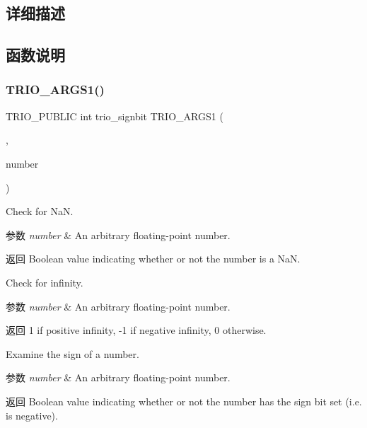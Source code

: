 \subsection{详细描述}


\subsection{函数说明}
\mbox{\label{group___special_quantities_ga820bb31d0a8e0106adeeb1b6b8857019}} 
\subsubsection{\texorpdfstring{T\+R\+I\+O\+\_\+\+A\+R\+G\+S1()}{TRIO\_ARGS1()}}
{\footnotesize\ttfamily T\+R\+I\+O\+\_\+\+P\+U\+B\+L\+IC int trio\+\_\+signbit T\+R\+I\+O\+\_\+\+A\+R\+G\+S1 (\begin{DoxyParamCaption}\item[{(number)}]{,  }\item[{double}]{number }\end{DoxyParamCaption})}

Check for NaN.


\begin{DoxyParams}{参数}
{\em number} & An arbitrary floating-\/point number. \\
\hline
\end{DoxyParams}
\begin{DoxyReturn}{返回}
Boolean value indicating whether or not the number is a NaN.
\end{DoxyReturn}
Check for infinity.


\begin{DoxyParams}{参数}
{\em number} & An arbitrary floating-\/point number. \\
\hline
\end{DoxyParams}
\begin{DoxyReturn}{返回}
1 if positive infinity, -\/1 if negative infinity, 0 otherwise.
\end{DoxyReturn}
Examine the sign of a number.


\begin{DoxyParams}{参数}
{\em number} & An arbitrary floating-\/point number. \\
\hline
\end{DoxyParams}
\begin{DoxyReturn}{返回}
Boolean value indicating whether or not the number has the sign bit set (i.\+e. is negative). 
\end{DoxyReturn}
\mbox{\label{group___special_quantities_gaccfad5a91a03898bf5e68f3d4040818e}} 
